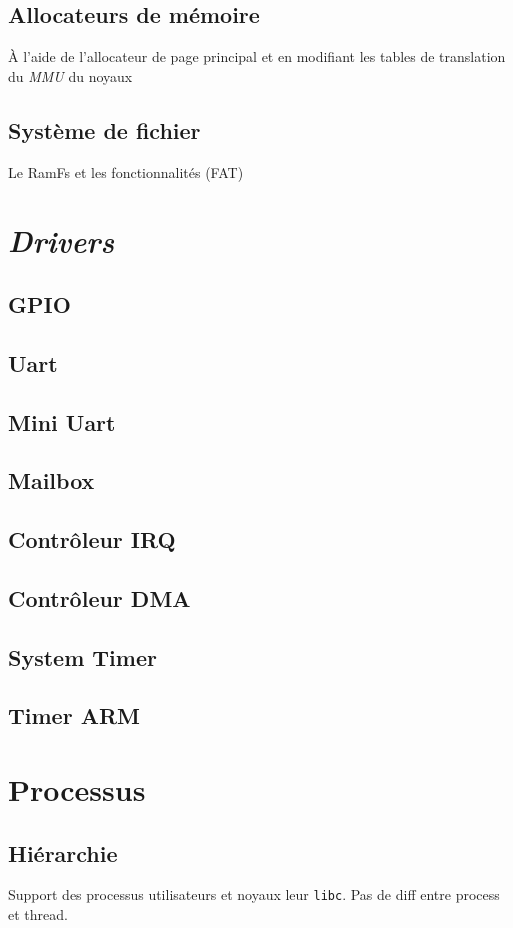 \documentclass[french, 12pt]{article}
\begin{document}
\subsection{Allocateurs de mémoire}
À l'aide de l'allocateur de page principal et en modifiant les tables de
translation du \textit{MMU} du noyaux


\subsection{Système de fichier}
Le RamFs et les fonctionnalités (FAT)

\section{\textit{Drivers}}
\subsection{GPIO}
\subsection{Uart}
\subsection{Mini Uart}
\subsection{Mailbox}
\subsection{Contrôleur IRQ}
\subsection{Contrôleur DMA}
\subsection{System Timer}
\subsection{Timer ARM}

\section{Processus}
\subsection{Hiérarchie}
Support des processus utilisateurs et noyaux leur \texttt{libc}.
Pas de diff entre process et thread.
\end{document}
